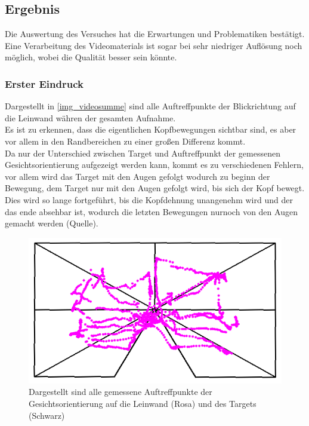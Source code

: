 \subsection{Ergebnis}
Die Auswertung des Versuches hat die Erwartungen und Problematiken bestätigt. Eine Verarbeitung des Videomaterials ist sogar bei sehr niedriger Auflösung noch möglich, wobei die Qualität besser sein könnte.
\subsubsection{Erster Eindruck}
Dargestellt in \autoref{img_videosumme} sind alle Auftreffpunkte der Blickrichtung auf die Leinwand währen der gesamten Aufnahme.\\
Es ist zu erkennen, dass die eigentlichen Kopfbewegungen sichtbar sind, es aber vor allem in den Randbereichen zu einer großen Differenz kommt.\\
Da nur der Unterschied zwischen Target und Auftreffpunkt der gemessenen Gesichtsorientierung aufgezeigt werden kann, kommt es zu verschiedenen Fehlern, vor allem wird das Target mit den Augen gefolgt wodurch zu beginn der Bewegung, dem Target nur mit den Augen gefolgt wird, bis sich der Kopf bewegt. Dies wird so lange fortgeführt, bis die Kopfdehnung unangenehm wird und der das ende absehbar ist, wodurch die letzten Bewegungen nurnoch von den Augen gemacht werden (Quelle).
\begin{figure}
	\centering
	\includegraphics[width=0.7\linewidth]{OpenFace_Img/VideoSumme}
	\caption{Dargestellt sind alle gemessene Auftreffpunkte der Gesichtsorientierung auf die Leinwand (Rosa) und des Targets (Schwarz)}
	\label{img_videosumme}
\end{figure}
